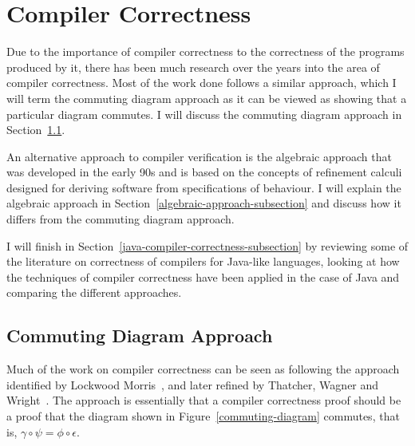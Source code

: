 \documentclass[a4paper,10pt]{report}
\begin{document}
\section{Compiler Correctness}
\label{compiler-correctness-section}

Due to the importance of compiler correctness to the correctness of the programs
produced by it, there has been much research over the years into the area of
compiler correctness. Most of the work done follows a similar approach, which I
will term the commuting diagram approach as it can be viewed as showing that a
particular diagram commutes. I will discuss the commuting diagram approach in
Section~\ref{commuting-diagram-subsection}.

An alternative approach to compiler verification is the algebraic approach that
was developed in the early 90s and is based on the concepts of refinement
calculi designed for deriving software from specifications of behaviour. I will
explain the algebraic approach in Section~\ref{algebraic-approach-subsection}
and discuss how it differs from the commuting diagram approach.

I will finish in Section~\ref{java-compiler-correctness-subsection} by reviewing
some of the literature on correctness of compilers for Java-like languages,
looking at how the techniques of compiler correctness have been applied in the
case of Java and comparing the different approaches.

\subsection{Commuting Diagram Approach}
\label{commuting-diagram-subsection}

Much of the work on compiler correctness can be seen as following the approach
identified by Lockwood Morris~\cite{morris1973}, and later refined by Thatcher,
Wagner and Wright~\cite{thatcher1979}. The approach is essentially that a
compiler correctness proof should be a proof that the diagram shown in
Figure~\ref{commuting-diagram} commutes, that is, $\gamma \circ \psi = \phi
\circ \epsilon$.
\end{document}
